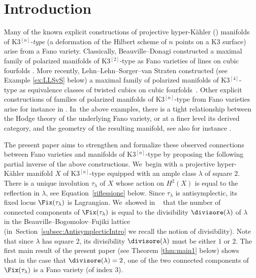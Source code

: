 \section{Introduction}\label{sec:intro}

Many of the known explicit constructions of projective hyper-Kähler (\HK) manifolds of K3$^{[n]}$\emph{-type} (\ie a deformation of the Hilbert scheme of $n$ points on a K3 surface) arise from a Fano variety.
Classically, Beauville--Donagi constructed a maximal family of polarized \HK manifolds of K3$^{[2]}$-type as Fano varieties of lines on cubic fourfolds \cite{BD:Fano}.
More recently, Lehn--Lehn--Sorger--van Straten constructed (see Example \ref{ex:LLSvS} below) a maximal family of polarized \HK manifolds of K3$^{[4]}$-type as equivalence classes of twisted cubics on cubic fourfolds~\cite{LLSvS:cubics}.
Other explicit constructions of families of polarized \HK manifolds of K3$^{[n]}$-type from Fano varieties arise for instance in \cite{DV:varieties,IM:Fano, DK:GMvarieties,IM:magicsquare,FM:Fano}. In~the above examples, there is a tight relationship between the Hodge theory of the underlying Fano variety, or at a finer level its derived category, and the geometry of the resulting \HK manifold, see also for instance \cite{BLMNPS:family,PPZ:GM,LPZ:twisted}.

The present paper aims to strengthen and formalize these observed connections between Fano varieties and \HK manifolds of K3$^{[n]}$-type by proposing the following partial inverse of the above constructions. We~begin with a projective hyper-Kähler manifold $X$ of K3$^{[n]}$-type equipped with an ample class $\lambda$ of square $2$. There is a unique involution $\tau_{\lambda}$ of $X$ whose action on $H^2(X)$ is equal to the reflection in $\lambda$, see Equation~\eqref{riflessione} below. Since $\tau_{\lambda}$ is antisymplectic, its fixed locus $\Fix(\tau_{\lambda})$ is Lagrangian. We~showed in ~\cite{involutions1} that the number of connected components of $\Fix(\tau_{\lambda})$ is equal to the divisibility $\divisore(\lambda)$ of $\lambda$ in the Beauville--Bogomolov--Fujiki lattice (in~Section~\ref{subsec:AntisymplecticIntro} we recall the notion of divisibility). Note that since $\lambda$ has square 2, its divisibility $\divisore(\lambda)$ must be either $1$ or $2$.
The first main result of the present paper (see Theorem \ref{thm:main1} below) shows that in the case that $\divisore(\lambda)=2$, one of the two connected components of $\Fix(\tau_{\lambda})$ is a Fano variety (of index 3).

